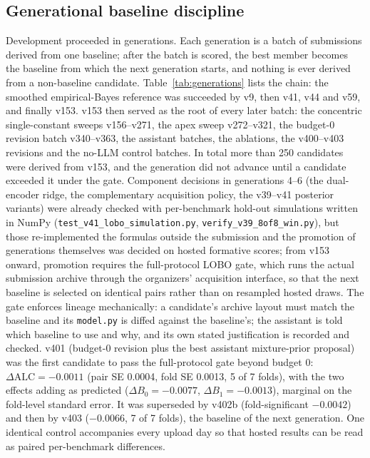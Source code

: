 \documentclass{article}
\begin{document}
\subsection{Generational baseline discipline}
\label{sec:generations}
Development proceeded in generations. Each generation is a batch of submissions derived from one baseline; after the batch is scored, the best member becomes the baseline from which the next generation starts, and nothing is ever derived from a non-baseline candidate. Table~\ref{tab:generations} lists the chain: the smoothed empirical-Bayes reference was succeeded by v9, then v41, v44 and v59, and finally v153. v153 then served as the root of every later batch: the concentric single-constant sweeps v156--v271, the apex sweep v272--v321, the budget-0 revision batch v340--v363, the assistant batches, the ablations, the v400--v403 revisions and the no-LLM control batches. In total more than 250 candidates were derived from v153, and the generation did not advance until a candidate exceeded it under the gate. Component decisions in generations 4--6 (the dual-encoder ridge, the complementary acquisition policy, the v39--v41 posterior variants) were already checked with per-benchmark hold-out simulations written in NumPy (\texttt{test\_v41\_lobo\_simulation.py}, \texttt{verify\_v39\_8of8\_win.py}), but those re-implemented the formulas outside the submission and the promotion of generations themselves was decided on hosted formative scores; from v153 onward, promotion requires the full-protocol LOBO gate, which runs the actual submission archive through the organizers' acquisition interface, so that the next baseline is selected on identical pairs rather than on resampled hosted draws. The gate enforces lineage mechanically: a candidate's archive layout must match the baseline and its \texttt{model.py} is diffed against the baseline's; the assistant is told which baseline to use and why, and its own stated justification is recorded and checked. v401 (budget-0 revision plus the best assistant mixture-prior proposal) was the first candidate to pass the full-protocol gate beyond budget 0: $\Delta\text{ALC}=-0.0011$ (pair SE 0.0004, fold SE 0.0013, 5 of 7 folds), with the two effects adding as predicted ($\Delta B_0=-0.0077$, $\Delta B_1=-0.0013$), marginal on the fold-level standard error. It was superseded by v402b (fold-significant $-0.0042$) and then by v403 ($-0.0066$, 7 of 7 folds), the baseline of the next generation. One identical control accompanies every upload day so that hosted results can be read as paired per-benchmark differences.
\end{document}
